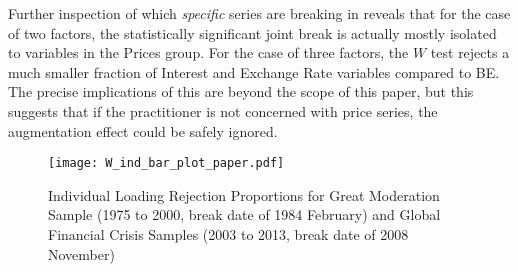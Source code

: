 \documentclass[12pt]{article}
\renewcommand{\marginnote}[2][]{}
\theoremstyle{plain}
\numberwithin{equation}{section}
\begin{document}
Further inspection of which \emph{specific} series are breaking in  reveals that for the case of two factors, the statistically significant joint break is actually mostly isolated to variables in the Prices group. For the case of three factors, the $W$ test rejects a much smaller fraction of Interest and Exchange Rate variables compared to BE. The precise implications of this are beyond the scope of this paper, but this suggests that if the practitioner is not concerned with price series, the augmentation effect could be safely ignored. 

\marginnote[Updated these plots, streamlined to just 1-4 factors as well.]{right}
\begin{figure}
\centering
\texttt{[image: W\_ind\_bar\_plot\_paper.pdf]}
\caption{Individual Loading Rejection Proportions for Great Moderation Sample (1975 to 2000, break date of 1984 February) and Global Financial Crisis Samples (2003 to 2013, break date of 2008 November)}
\label{fig:gfc_w_ind}
\end{figure}
\end{document}
